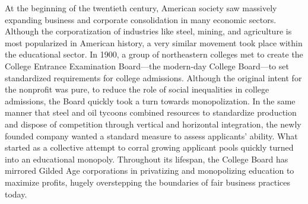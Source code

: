 
At the beginning of the twentieth century, American society saw massively expanding business and corporate consolidation in many economic sectors. Although the corporatization of industries like steel, mining, and agriculture is most popularized in American history, a very similar movement took place within the educational sector. In 1900, a group of northeastern colleges met to create the College Entrance Examination Board—the modern-day College Board—to set standardized requirements for college admissions. Although the original intent for the nonprofit was pure, to reduce the role of social inequalities in college admissions, the Board quickly took a turn towards monopolization. In the same manner that steel and oil tycoons combined resources to standardize production and dispose of competition through vertical and horizontal integration, the newly founded company wanted a standard measure to assess applicants' ability. What started as a collective attempt to corral growing applicant pools quickly turned into an educational monopoly. Throughout its lifespan, the College Board has mirrored Gilded Age corporations in privatizing and monopolizing education to maximize profits, hugely overstepping the boundaries of fair business practices today. 

